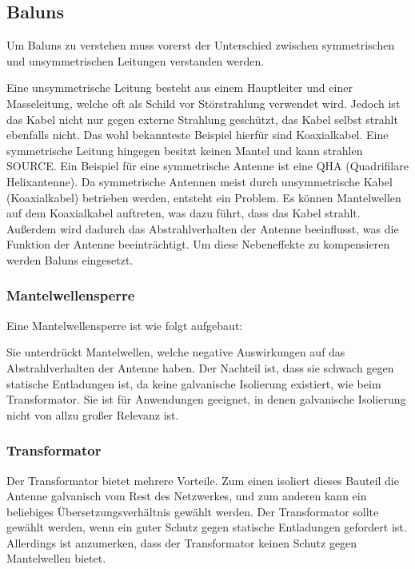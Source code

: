 \subsection{Baluns}
Um Baluns zu verstehen muss vorerst der Unterschied zwischen symmetrischen und unsymmetrischen Leitungen verstanden werden. 

Eine unsymmetrische Leitung besteht aus einem Hauptleiter und einer Masseleitung, welche oft als Schild vor Störstrahlung verwendet wird. Jedoch ist das Kabel nicht nur gegen externe Strahlung geschützt, das Kabel selbst strahlt ebenfalls nicht. Das wohl bekannteste Beispiel hierfür sind Koaxialkabel. Eine symmetrische Leitung hingegen besitzt keinen Mantel und kann strahlen SOURCE. Ein Beispiel für eine symmetrische Antenne ist eine QHA (Quadrifilare Helixantenne). Da symmetrische Antennen meist durch unsymmetrische Kabel (Koaxialkabel) betrieben werden, entsteht ein Problem. Es können Mantelwellen auf dem Koaxialkabel auftreten, was dazu führt, dass das Kabel strahlt. Außerdem wird dadurch das Abstrahlverhalten der Antenne beeinflusst, was die Funktion der Antenne beeinträchtigt. Um diese Nebeneffekte zu kompensieren werden Baluns eingesetzt.

\subsubsection{Mantelwellensperre}
Eine Mantelwellensperre ist wie folgt aufgebaut:


Sie unterdrückt Mantelwellen, welche negative Auswirkungen auf das Abstrahlverhalten der Antenne haben. Der Nachteil ist, dass sie schwach gegen statische Entladungen ist, da keine galvanische Isolierung existiert, wie beim Transformator. Sie ist für Anwendungen geeignet, in denen galvanische Isolierung nicht von allzu großer Relevanz ist.

\subsubsection{Transformator}
Der Transformator bietet mehrere Vorteile. Zum einen isoliert dieses Bauteil die Antenne galvanisch vom Rest des Netzwerkes, und zum anderen kann ein beliebiges Übersetzungsverhältnis gewählt werden. Der Transformator sollte gewählt werden, wenn ein guter Schutz gegen statische Entladungen gefordert ist. Allerdings ist anzumerken, dass der Transformator keinen Schutz gegen Mantelwellen bietet.

